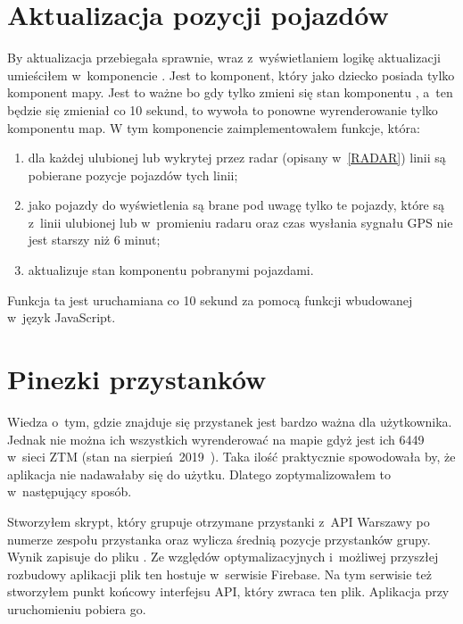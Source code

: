 \documentclass{SGGW-thesis}
\begin{document}
\section{Aktualizacja pozycji pojazdów}
By aktualizacja przebiegała sprawnie, wraz z~wyświetlaniem logikę aktualizacji umieściłem w~komponencie .
Jest to komponent, który jako dziecko posiada tylko komponent mapy.
Jest to ważne bo gdy tylko zmieni się stan komponentu , a~ten będzie się zmieniał co 10 sekund, to wywoła to ponowne wyrenderowanie tylko komponentu map.
W tym komponencie zaimplementowałem funkcje, która:
\begin{enumerate}
  \item{dla każdej ulubionej lub wykrytej przez radar (opisany w~\ref{RADAR}) linii są pobierane pozycje pojazdów tych linii;}
  \item{jako pojazdy do wyświetlenia są brane pod uwagę tylko te pojazdy, które są z~linii ulubionej lub w~promieniu radaru oraz czas wysłania sygnału GPS nie jest starszy niż 6 minut;}
  \item{aktualizuje stan komponentu  pobranymi pojazdami.}
\end{enumerate}
Funkcja ta jest uruchamiana co 10 sekund za pomocą funkcji  wbudowanej w~język JavaScript.

\section{Pinezki przystanków}
Wiedza o~tym, gdzie znajduje się przystanek jest bardzo ważna dla użytkownika.
Jednak nie można ich wszystkich wyrenderować na mapie gdyż jest ich 6449 w~sieci ZTM (stan na sierpień~2019~\cite{ZTMSTATS}).
Taka ilość praktycznie spowodowała by, że aplikacja nie nadawałaby się do użytku.
Dlatego zoptymalizowałem to w~następujący sposób.

\label{FIREBASE}
Stworzyłem skrypt, który grupuje otrzymane przystanki z~API Warszawy po numerze zespołu przystanka oraz wylicza średnią pozycje przystanków grupy.
Wynik zapisuje do pliku .
Ze względów optymalizacyjnych i~możliwej przyszłej rozbudowy aplikacji plik ten hostuje w~serwisie Firebase.
Na tym serwisie też stworzyłem punkt końcowy interfejsu API, który zwraca ten plik.
Aplikacja przy uruchomieniu pobiera go.
\end{document}
